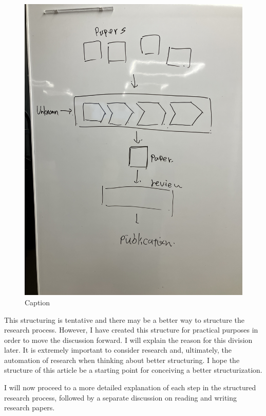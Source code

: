 \documentclass{article}
\begin{document}
\begin{figure}[h]
    \centering
    \includegraphics[width=\textwidth]{figs/researchprocess.jpg}
    \caption{Caption}
    \label{fig:research_process}
\end{figure}

This structuring is tentative and there may be a better way to structure the research process. However, I have created this structure for practical purposes in order to move the discussion forward. I will explain the reason for this division later. It is extremely important to consider research and, ultimately, the automation of research when thinking about better structuring. I hope the structure of this article be a starting point for conceiving a better structurization.

I will now proceed to a more detailed explanation of each step in the structured research process, followed by a separate discussion on reading and writing research papers.
\end{document}
